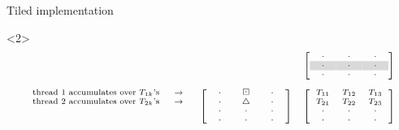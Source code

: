 \documentclass[12pt,aspectratio=1610]{beamer}
\begin{document}
\begin{frame}{Tiled implementation}
\begin{onlyenv}
\begin{onlyenv}<2>
\[
\scriptsize
\begin{array}{ccc}
&& \left[\begin{array}{ccc}
\ \ \cdot \ \ & \ \ \cdot \ \  & \ \ \cdot \ \ \\
\ \ \cl{\cdot} \ \ & \ \ \cl{\cdot} \ \  & \ \ \cl{\cdot} \ \ \\
\ \ \cdot \ \ & \ \ \cdot \ \  & \ \ \cdot \ \ \\
\end{array}\right]\\
\\
\begin{array}{r}
\text{thread 1 accumulates over $T_{1k}$'s} \ \ \ \ \rw\\
\text{thread 2 accumulates over $T_{2k}$'s} \ \ \ \ \rw\\
\\
\\
\end{array}
& \left[\begin{array}{ccc}
\ \ \cdot \ \  & \bd & \ \ \cdot \ \  \\
\ \ \cdot \ \  & \uptri & \ \ \cdot \ \  \\
\ \ \cdot \ \ & \ \ \cdot \ \  & \ \ \cdot \ \ \\
\ \ \cdot \ \ & \ \ \cdot \ \  & \ \ \cdot \ \ \\
\end{array}\right]
& \left[\begin{array}{ccc}
T_{11} & T_{12} & T_{13} \\
T_{21} & T_{22} & T_{23} \\
\ \ \cdot \ \ & \ \ \cdot \ \  & \ \ \cdot \ \ \\
\ \ \cdot \ \ & \ \ \cdot \ \  & \ \ \cdot \ \ \\
\end{array}\right]
\end{array}
\]
\end{onlyenv}


\end{onlyenv}
\end{frame}
\end{document}
